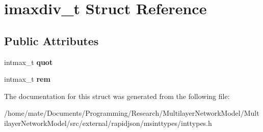 \hypertarget{structimaxdiv__t}{}\section{imaxdiv\+\_\+t Struct Reference}
\label{structimaxdiv__t}
\subsection*{Public Attributes}
\begin{DoxyCompactItemize}
\item 
intmax\+\_\+t {\bfseries quot}\hypertarget{structimaxdiv__t_a9339814cbb7610c72fb7d30c6573b393}{}\label{structimaxdiv__t_a9339814cbb7610c72fb7d30c6573b393}

\item 
intmax\+\_\+t {\bfseries rem}\hypertarget{structimaxdiv__t_a6c9701ad10bff81edae7ff679cae7850}{}\label{structimaxdiv__t_a6c9701ad10bff81edae7ff679cae7850}

\end{DoxyCompactItemize}


The documentation for this struct was generated from the following file\+:\begin{DoxyCompactItemize}
\item 
/home/mate/\+Documents/\+Programming/\+Research/\+Multilayer\+Network\+Model/\+Multilayer\+Network\+Model/src/external/rapidjson/msinttypes/inttypes.\+h\end{DoxyCompactItemize}
